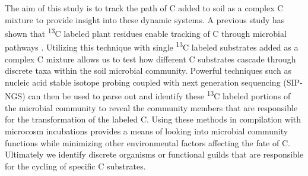 The aim of this study is to track the path of C added to soil as a complex C mixture to provide insight into these dynamic systems. A previous study has shown that \textsuperscript{13}C labeled plant residues enable tracking of C through microbial pathways \cite{Evershed_2006}. Utilizing this technique with single \textsuperscript{13}C labeled substrates added as a complex C mixture allows us to test how different C substrates cascade through discrete taxa within the soil microbial community. Powerful techniques such as nucleic acid stable isotope probing coupled with next generation sequencing (SIP-NGS) can then be used to parse out and identify these \textsuperscript{13}C labeled portions of the microbial community to reveal the community members that are responsible for the transformation of the labeled C. Using these methods in compilation with microcosm incubations provides a means of looking into microbial community functions while minimizing other environmental factors affecting the fate of C. Ultimately we identify discrete organisms or functional guilds that are responsible for the cycling of specific C substrates.  